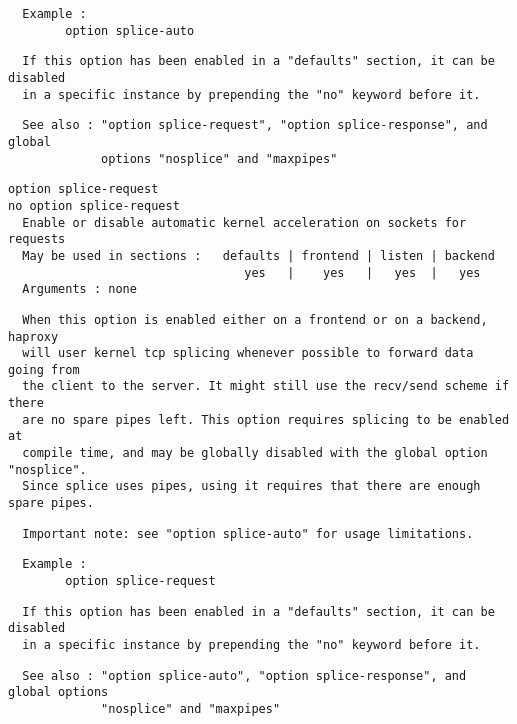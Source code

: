 \begin{verbatim}
  Example :
        option splice-auto
\end{verbatim}

\begin{verbatim}
  If this option has been enabled in a "defaults" section, it can be disabled
  in a specific instance by prepending the "no" keyword before it.
\end{verbatim}

\begin{verbatim}
  See also : "option splice-request", "option splice-response", and global
             options "nosplice" and "maxpipes"
\end{verbatim}

\begin{verbatim}
option splice-request
no option splice-request
  Enable or disable automatic kernel acceleration on sockets for requests
  May be used in sections :   defaults | frontend | listen | backend
                                 yes   |    yes   |   yes  |   yes
  Arguments : none
\end{verbatim}

\begin{verbatim}
  When this option is enabled either on a frontend or on a backend, haproxy
  will user kernel tcp splicing whenever possible to forward data going from
  the client to the server. It might still use the recv/send scheme if there
  are no spare pipes left. This option requires splicing to be enabled at
  compile time, and may be globally disabled with the global option "nosplice".
  Since splice uses pipes, using it requires that there are enough spare pipes.
\end{verbatim}

\begin{verbatim}
  Important note: see "option splice-auto" for usage limitations.
\end{verbatim}

\begin{verbatim}
  Example :
        option splice-request
\end{verbatim}

\begin{verbatim}
  If this option has been enabled in a "defaults" section, it can be disabled
  in a specific instance by prepending the "no" keyword before it.
\end{verbatim}

\begin{verbatim}
  See also : "option splice-auto", "option splice-response", and global options
             "nosplice" and "maxpipes"
\end{verbatim}

